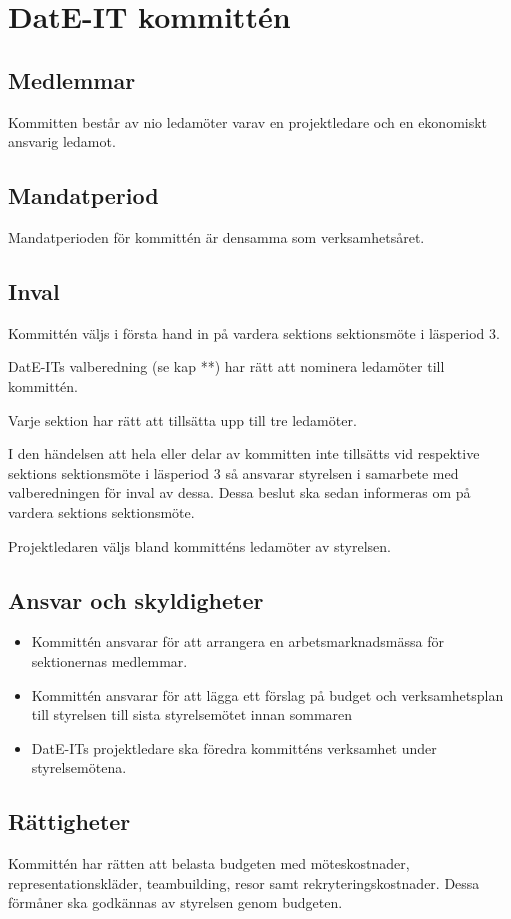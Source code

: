 \documentclass{article}
\begin{document}
\section{DatE-IT kommittén}
\subsection{Medlemmar}
Kommitten består av nio ledamöter varav en projektledare och en ekonomiskt ansvarig ledamot.

\subsection{Mandatperiod}
Mandatperioden för kommittén är densamma som verksamhetsåret.

\subsection{Inval}
Kommittén väljs i första hand in på vardera sektions sektionsmöte i läsperiod 3.

DatE-ITs valberedning (se kap **) har rätt att nominera ledamöter till kommittén.

Varje sektion har rätt att tillsätta upp till tre ledamöter. 

I den händelsen att hela eller delar av kommitten inte tillsätts vid respektive sektions sektionsmöte i läsperiod 3 så ansvarar styrelsen i samarbete med valberedningen för inval av dessa. Dessa beslut ska sedan informeras om på vardera sektions sektionsmöte. 

Projektledaren väljs bland kommitténs ledamöter av styrelsen.

\subsection{Ansvar och skyldigheter}
\begin{itemize}
    \item Kommittén ansvarar för att arrangera en arbetsmarknadsmässa för sektionernas medlemmar. 
    \item Kommittén ansvarar för att lägga ett förslag på budget och verksamhetsplan till styrelsen till sista styrelsemötet innan sommaren
    \item DatE-ITs projektledare ska föredra kommitténs verksamhet under styrelsemötena.
\end{itemize}

\subsection{Rättigheter}
Kommittén har rätten att belasta budgeten med möteskostnader, representationskläder, teambuilding, resor samt rekryteringskostnader. Dessa förmåner ska godkännas av styrelsen genom budgeten.
\end{document}
